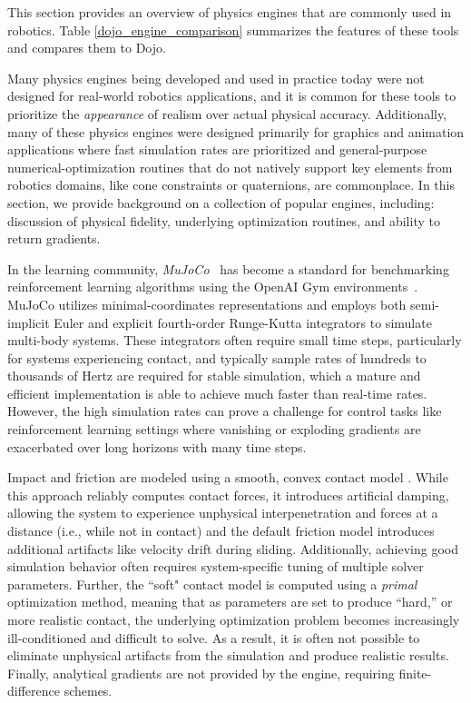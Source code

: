 This section provides an overview of physics engines that are commonly used in robotics. Table \ref{dojo_engine_comparison} summarizes the features of these tools and compares them to Dojo.

Many physics engines being developed and used in practice today were not designed for real-world robotics applications, and it is common for these tools to prioritize the \textit{appearance} of realism over actual physical accuracy. Additionally, many of these physics engines were designed primarily for graphics and animation applications where fast simulation rates are prioritized and general-purpose numerical-optimization routines that do not natively support key elements from robotics domains, like cone constraints or quaternions, are commonplace. In this section, we provide background on a collection of popular engines, including: discussion of physical fidelity, underlying optimization routines, and ability to return gradients.

In the learning community, \emph{MuJoCo}~\cite{todorov2012mujoco} has become a standard for benchmarking reinforcement learning algorithms using the OpenAI Gym environments~\cite{brockman2016openai}.
MuJoCo utilizes minimal-coordinates representations and employs both semi-implicit Euler and explicit fourth-order Runge-Kutta integrators to simulate multi-body systems. These integrators often require small time steps, particularly for systems experiencing contact, and typically sample rates of hundreds to thousands of Hertz are required for stable simulation, which a mature and efficient implementation is able to achieve much faster than real-time rates. However, the high simulation rates can prove a challenge for control tasks like reinforcement learning settings where vanishing or exploding gradients are exacerbated over long horizons with many time steps.

Impact and friction are modeled using a smooth, convex contact model \cite{todorov2014convex}. While this approach reliably computes contact forces, it introduces artificial damping, allowing the system to experience unphysical interpenetration and forces at a distance (i.e., while not in contact) and the default friction model introduces additional artifacts like velocity drift during sliding. Additionally, achieving good simulation behavior often requires system-specific tuning of multiple solver parameters. Further, the ``soft" contact model is computed using a \textit{primal} optimization method, meaning that as parameters are set to produce ``hard,'' or more realistic contact, the underlying optimization problem becomes increasingly ill-conditioned and difficult to solve. As a result, it is often not possible to eliminate unphysical artifacts from the simulation and produce realistic results. Finally, analytical gradients are not provided by the engine, requiring finite-difference schemes.

